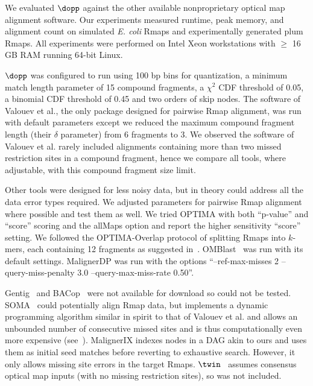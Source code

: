 \documentclass[doctor]{thesis}
\begin{document}
 
\makeatletter{}\label{sec-results}


We evaluated $\dopp$ against the other available nonproprietary optical map alignment software.
Our experiments measured runtime, peak memory, and  alignment count on simulated {\em E. coli} Rmaps and experimentally generated plum Rmaps.  All experiments were performed on Intel Xeon workstations with $\ge$ 16 GB RAM running 64-bit Linux.

$\dopp$ was configured to run using 100 bp bins for quantization, a minimum match length parameter of 15 compound fragments, a $\chi^2$ CDF threshold of 0.05, a binomial CDF threshold of 0.45 and two orders of skip nodes.
The software of Valouev et al., the only package designed for pairwise Rmap alignment, was run with default parameters except we reduced the maximum compound fragment length (their $\delta$ parameter) from 6 fragments to 3. We observed the software of Valouev et al. rarely included alignments containing more than two missed restriction sites in a compound fragment, hence we compare all tools, where adjustable, with this compound fragment size limit.

Other tools were designed for less noisy data, but in theory could address all the data error types required. We adjusted parameters for pairwise Rmap alignment where possible and test them as well. We tried OPTIMA with both ``p-value'' and ``score'' scoring and the allMaps option and report the higher sensitivity ``score'' setting.  We followed the OPTIMA-Overlap protocol of splitting Rmaps into $k$-mers, each containing 12 fragments as suggested in~\cite{optima}.
OMBlast~\cite{omblast} was run with its default settings.
MalignerDP was run with the options ``--ref-max-misses 2 --query-miss-penalty 3.0 --query-max-miss-rate 0.50''.



Gentig~\cite{Anantharaman01} and BACop~\cite{Zhou09} were not available for download so could not be tested. SOMA~\cite{Nagarajan08} could potentially align Rmap data, but implements a dynamic programming algorithm similar in spirit to that of Valouev et al. and allows an unbounded number of consecutive missed sites and is thus computationally even more expensive (see~\cite{wabi2014}).  MalignerIX indexes nodes in a DAG akin to ours and uses them as initial seed matches before reverting to exhaustive search.  However, it only allows missing site errors in the target Rmaps.  $\twin$~\cite{wabi2014} assumes consensus optical map inputs (with no missing restriction sites), so was not included.
\end{document}
